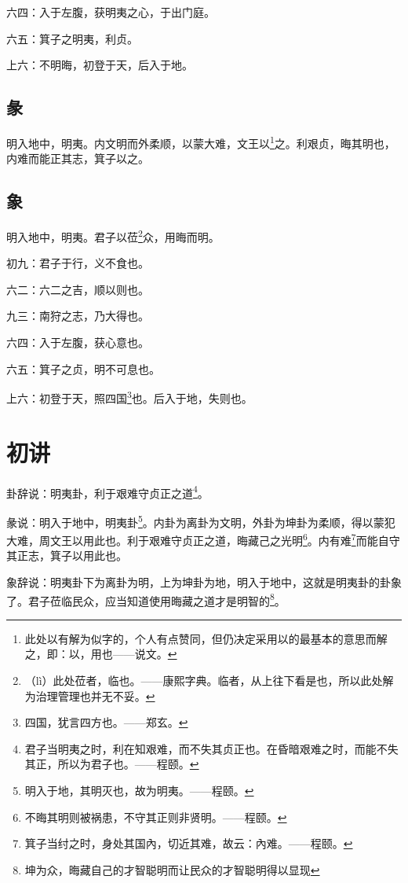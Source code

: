 \documentclass[12pt,oneside]{book}
\begin{document}
六四：入于左腹，获明夷之心，于出门庭。

六五：箕子之明夷，利贞。

上六：不明晦，初登于天，后入于地。

\subsection{彖}
明入地中，明夷。内文明而外柔顺，以蒙大难，文王以\footnote{此处以有解为似字的，个人有点赞同，但仍决定采用以的最基本的意思而解之，即：以，用也——说文。}之。利艰贞，晦其明也，内难而能正其志，箕子以之。

\subsection{象}
明入地中，明夷。君子以莅\footnote{（lì）此处莅者，临也。——康熙字典。临者，从上往下看是也，所以此处解为治理管理也并无不妥。}众，用晦而明。

初九：君子于行，义不食也。

六二：六二之吉，顺以则也。

九三：南狩之志，乃大得也。

六四：入于左腹，获心意也。

六五：箕子之贞，明不可息也。

上六：初登于天，照四国\footnote{四国，犹言四方也。——郑玄。}也。后入于地，失则也。

\section{初讲}
卦辞说：明夷卦，利于艰难守贞正之道\footnote{君子当明夷之时，利在知艰难，而不失其贞正也。在昏暗艰难之时，而能不失其正，所以为君子也。——程颐。}。

彖说：明入于地中，明夷卦\footnote{明入于地，其明灭也，故为明夷。——程颐。}。内卦为离卦为文明，外卦为坤卦为柔顺，得以蒙犯大难，周文王以用此也。利于艰难守贞正之道，晦藏己之光明\footnote{不晦其明则被祸患，不守其正则非贤明。——程颐。}。内有难\footnote{箕子当纣之时，身处其国內，切近其难，故云：內难。——程颐。}而能自守其正志，箕子以用此也。

象辞说：明夷卦下为离卦为明，上为坤卦为地，明入于地中，这就是明夷卦的卦象了。君子莅临民众，应当知道使用晦藏之道才是明智的\footnote{坤为众，晦藏自己的才智聪明而让民众的才智聪明得以显现}。
\end{document}

